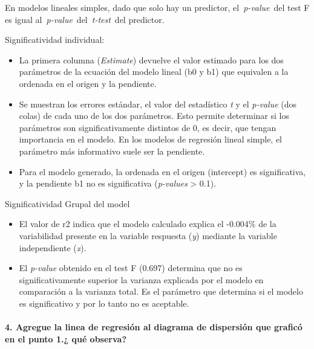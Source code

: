 \documentclass[
]{article}
\newenvironment{Shaded}{\begin{snugshade}}{\end{snugshade}}
\newcommand{\CommentTok}[1]{\textcolor[rgb]{0.56,0.35,0.01}{\textit{#1}}}
\begin{document}
\begin{Shaded}
\end{Shaded}

En modelos lineales simples, dado que solo hay un predictor,
el~\emph{p-value}~del test F es igual
al~\emph{p-value}~del~\emph{t-test}~del predictor.

Significatividad individual:

\begin{itemize}
\item
  La primera columna (\emph{Estimate}) devuelve el valor estimado para
  los dos parámetros de la ecuación del modelo lineal (b0 y b1) que
  equivalen a la ordenada en el origen y la pendiente.
\item
  Se muestran los errores estándar, el valor del estadístico \emph{t} y
  el \emph{p-value} (dos colas) de cada uno de los dos parámetros. Esto
  permite determinar si los parámetros son significativamente distintos
  de 0, es decir, que tengan importancia en el modelo. En los modelos de
  regresión lineal simple, el parámetro más informativo suele ser la
  pendiente.
\item
  Para el modelo generado, la ordenada en el origen (intercept) es
  significativa, y la pendiente b1 no es significativa (\emph{p-values}
  \textgreater{} 0.1).
\end{itemize}

Significatividad Grupal del model

\begin{itemize}
\item
  El valor de r2 indica que el modelo calculado explica el -0.004\% de
  la variabilidad presente en la variable respuesta (\emph{y}) mediante
  la variable independiente (\emph{x}).
\item
  El \emph{p-value} obtenido en el test F (0.697) determina que no es
  significativamente superior la varianza explicada por el modelo en
  comparación a la varianza total. Es el parámetro que determina si el
  modelo es significativo y por lo tanto no es aceptable.
\end{itemize}

\hypertarget{agregue-la-linea-de-regresiuxf3n-al-diagrama-de-dispersiuxf3n-que-graficuxf3-en-el-punto-1.-quuxe9-observa}{%
\paragraph{4. Agregue la linea de regresión al diagrama de dispersión
que graficó en el punto 1.¿ qué
observa?}\label{agregue-la-linea-de-regresiuxf3n-al-diagrama-de-dispersiuxf3n-que-graficuxf3-en-el-punto-1.-quuxe9-observa}}
\end{document}
